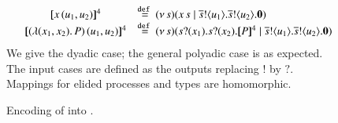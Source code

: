 \begin{figure}[t]
\[\begin{array}{lcl}
	& \map{\appl{x}{(u_1, u_2)}}^{4} &\defeq \newsp{s}{\appl{x}{s} \Par \bout{\dual{s}}{u_1}   \bout{\dual{s}}{u_2} \inact}
	\\
	& \map{\appl{(\abs{(x_1,x_2)}{P})}{(u_1, u_2)}}^{4} &\defeq
	\newsp{s}{\binp{s}{x_1}  \binp{s}{x_2} \pmap{P}{4} \Par \bout{\dual{s}}{u_1}  \bout{\dual{s}}{u_2} \inact} 
\end{array}
\]
We give the dyadic case;
the general polyadic case is as expected.
The input cases are defined as the outputs replacing $!$ by $?$. 
Mappings for elided processes and types are 
homomorphic.
\vspace{-2mm}
\caption{\label{f:enc:poltomon}Encoding of \PHOp into \HOp. }
\vspace{-1mm} 
\end{figure}

